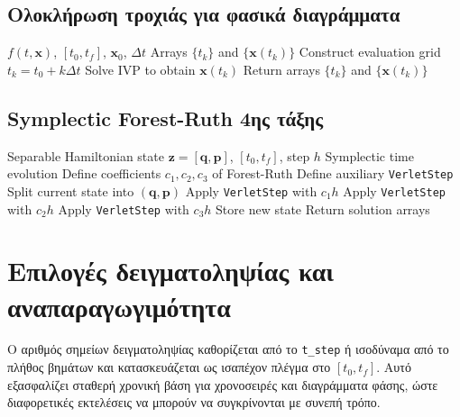 \documentclass[11pt,a4paper]{report}
\begin{document}
\subsection*{Ολοκλήρωση τροχιάς για φασικά διαγράμματα}
\begin{algorithm}[H]
\caption{Trajectory integration for phase portraits}
\label{alg:traj-phase-tuned}
\begin{tcolorbox}[appendixalgobox]
\begin{algorithmic}[1]
\Require $f(t,\mathbf{x})$, $[t_0,t_f]$, $\mathbf{x}_0$, $\Delta t$
\Ensure Arrays $\{t_k\}$ and $\{\mathbf{x}(t_k)\}$
\State Construct evaluation grid $t_k = t_0 + k\Delta t$
\State Solve IVP to obtain $\mathbf{x}(t_k)$
\State Return arrays $\{t_k\}$ and $\{\mathbf{x}(t_k)\}$
\end{algorithmic}
\end{tcolorbox}
\end{algorithm}

\subsection*{Symplectic Forest-Ruth 4ης τάξης}
\begin{algorithm}[H]
\caption{\texttt{integrate\_system\_symplectic\_fr}}
\label{alg:fr4-tuned}
\begin{tcolorbox}[appendixalgobox]
\begin{algorithmic}[1]
\Require Separable Hamiltonian state $\mathbf{z}=[\mathbf{q},\mathbf{p}]$, $[t_0,t_f]$, step $h$
\Ensure Symplectic time evolution
\State Define coefficients $c_1,c_2,c_3$ of Forest-Ruth
\State Define auxiliary \texttt{VerletStep}
  \State Split current state into $(\mathbf{q},\mathbf{p})$
  \State Apply \texttt{VerletStep} with $c_1h$
  \State Apply \texttt{VerletStep} with $c_2h$
  \State Apply \texttt{VerletStep} with $c_3h$
  \State Store new state
\EndFor
\State Return solution arrays
\end{algorithmic}
\end{tcolorbox}
\end{algorithm}

\section{Επιλογές δειγματοληψίας και αναπαραγωγιμότητα}
\label{app:sampling}
Ο αριθμός σημείων δειγματοληψίας καθορίζεται από το \texttt{t\_step} ή
ισοδύναμα από το πλήθος βημάτων και κατασκευάζεται ως ισαπέχον πλέγμα στο
$[t_0,t_f]$. Αυτό εξασφαλίζει σταθερή χρονική βάση για χρονοσειρές και
διαγράμματα φάσης, ώστε διαφορετικές εκτελέσεις να μπορούν να συγκρίνονται με
συνεπή τρόπο.
\end{document}
